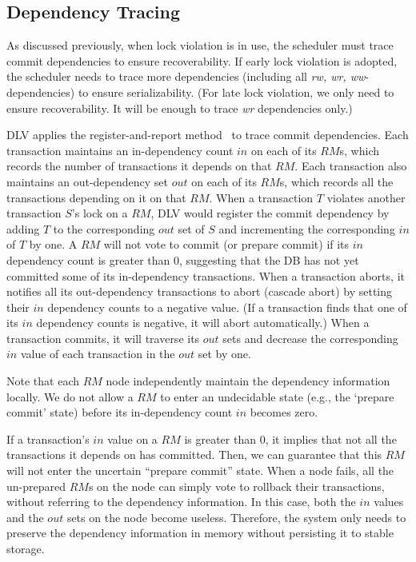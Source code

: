 \documentclass[conference]{IEEEtran}
\begin{document}
\subsection{Dependency Tracing}
As discussed previously, when lock violation is in use,
the scheduler must trace commit dependencies to ensure recoverability.
If early lock violation is adopted, the scheduler needs to trace more dependencies (including all \emph{rw, wr, ww}-dependencies) to ensure serializability.
(For late lock violation, we only need to ensure recoverability.
It will be enough to trace \emph{wr} dependencies only.)

DLV applies the register-and-report method~\cite{HeckatonMVCC:journals/pvldb/LarsonBDFPZ11} to trace commit dependencies.
Each transaction maintains an in-dependency count ${in}$ on each of its ${RM}$s, which records the number of transactions it depends on that ${RM}$.
Each transaction also maintains an out-dependency set  ${out}$ on each of its ${RM}$s, which records all the transactions depending on it on that ${RM}$.
When a transaction ${T}$ violates another transaction ${S}$'s lock on a ${RM}$,
DLV would register the commit dependency by adding ${T}$ to the corresponding ${out}$ set of ${S}$ and incrementing the corresponding ${in}$ of ${T}$ by one.
A ${RM}$ will not vote to commit (or prepare commit) if its ${in}$ dependency count is greater than 0, suggesting that the DB has not yet committed some of its in-dependency transactions.
When a transaction aborts, it notifies all its out-dependency transactions to abort (cascade abort) by setting their ${in}$ dependency counts to a negative value.
(If a transaction finds that one of its ${in}$ dependency counts is negative, it will abort automatically.)
When a transaction commits, it will traverse its ${out}$ sets and decrease the corresponding ${in}$ value of each transaction in the ${out}$ set by one.

Note that each $RM$ node independently maintain the dependency information locally.
We do not allow a ${RM}$ to enter an undecidable state (e.g., the `prepare commit' state) before its in-dependency count ${in}$ becomes zero.

If a transaction's ${in}$ value on a ${RM}$ is greater than 0, it implies that not all the transactions it depends on has committed.
Then, we can guarantee that this ${RM}$ will not enter the uncertain ``prepare commit'' state.
When a node fails, all the un-prepared ${RM}$s on the node can simply vote to rollback their transactions, without referring to the dependency information.
In this case, both the ${in}$ values and the ${out}$ sets on the node become useless.
Therefore, the system only needs to preserve the dependency information in memory without persisting it to stable storage.
\end{document}
